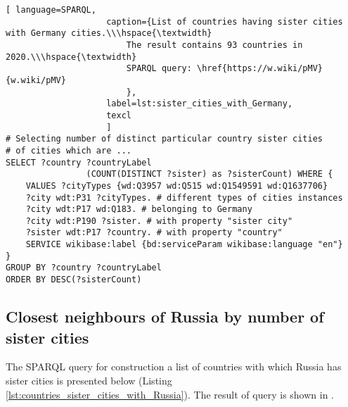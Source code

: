 \newpage
{}
\begin{lstlisting}[ language=SPARQL, 
                    caption={List of countries having sister cities with Germany cities.\\\hspace{\textwidth}
                        The result contains 93 countries in 2020.\\\hspace{\textwidth}
                        SPARQL query: \href{https://w.wiki/pMV}{w.wiki/pMV}
                        },
                    label=lst:sister_cities_with_Germany,
                    texcl 
                    ]
# Selecting number of distinct particular country sister cities  
# of cities which are ...
SELECT ?country ?countryLabel 
				(COUNT(DISTINCT ?sister) as ?sisterCount) WHERE {                                                          
	VALUES ?cityTypes {wd:Q3957 wd:Q515 wd:Q1549591 wd:Q1637706}
	?city wdt:P31 ?cityTypes. # different types of cities instances
	?city wdt:P17 wd:Q183. # belonging to Germany  
	?city wdt:P190 ?sister. # with property "sister city"
	?sister wdt:P17 ?country. # with property "country"
	SERVICE wikibase:label {bd:serviceParam wikibase:language "en"}
}
GROUP BY ?country ?countryLabel
ORDER BY DESC(?sisterCount)
\end{lstlisting}%

\subsection{Closest neighbours of Russia by number of sister cities}

The SPARQL query for construction a list of countries with which Russia has sister cities is presented below (Listing \ref{lst:countries_sister_cities_with_Russia}). The result of query is shown in .


